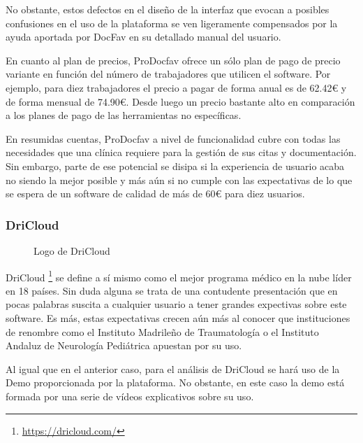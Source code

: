 No obstante, estos defectos en el diseño de la interfaz que evocan a posibles confusiones en el uso de la plataforma se ven ligeramente compensados por la ayuda aportada por DocFav en su detallado manual del usuario. \bigskip

En cuanto al plan de precios, ProDocfav ofrece un sólo plan de pago de precio variante en función del número de trabajadores que utilicen el software. Por ejemplo, para diez trabajadores el precio a pagar de forma anual es de 62.42€ y de forma mensual de 74.90€. Desde luego un precio bastante alto en comparación a los planes de pago de las herramientas no específicas. \bigskip

En resumidas cuentas, ProDocfav a nivel de funcionalidad cubre con todas las necesidades que una clínica requiere para la gestión de sus citas y documentación. Sin embargo, parte de ese potencial se disipa si la experiencia de usuario acaba no siendo la mejor posible y más aún si no cumple con las expectativas de lo que se espera de un software de calidad de más de 60€ para diez usuarios. 

\subsubsection*{DriCloud}

\begin{figure}[H]
    \caption{Logo de DriCloud}
    \label{fig:dricloud-logo}
\end{figure}

DriCloud \footnote{\url{https://dricloud.com/}} se define a sí mismo como  el mejor programa médico en la nube líder en 18 países. Sin duda alguna se trata de una contudente presentación que en pocas palabras suscita a cualquier usuario a tener grandes expectivas sobre este software. Es más, estas expectativas crecen aún más al conocer que instituciones de renombre como el Instituto Madrileño de Traumatología o el Instituto Andaluz de Neurología Pediátrica apuestan por su uso. \bigskip

Al igual que en el anterior caso, para el análisis de DriCloud se hará uso de la Demo proporcionada por la plataforma. No obstante, en este caso la demo está formada por una serie de vídeos explicativos sobre su uso. \bigskip

